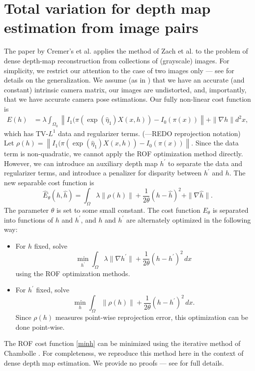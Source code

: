 \documentclass[conference]{IEEEtran}
\begin{document}
\section{Total variation for depth map estimation from image pairs}
The paper by Cremer's et al. \cite{dense_geometry} applies the method of Zach et al. \cite{tv_optical_flow} to
the problem of dense depth-map
reconstruction from collections of (grayscale) images. For simplicity, we restrict our attention to the case of two images only ---
see \cite{dense_geometry} for details on the generalization. We assume (as in \cite{dense_geometry}) that we have an accurate (and constant) intrinsic camera matrix,
our images are undistorted, and, importantly, that we have accurate camera pose estimations.
Our fully non-linear cost function is
\begin{equation}
\begin{split}
E(h) &= \lambda \int_{\Omega_0}\left\|I_1(\pi(\exp(\hat{\eta}_1)X(x,h)) - I_0(\pi(x))\right\|
     + \|\nabla h\| d^2 x,
\end{split}
\end{equation}
which has TV-$L^1$ \cite{tv_optical_flow} data and regularizer terms.
(---REDO reprojection notation)
Let $\rho(h) = \left\|I_1(\pi(\exp(\hat{\eta}_1)X(x,h)) - I_0(\pi(x))\right\|$. Since the data term is non-quadratic, we
cannot apply the ROF optimization method directly. However, we can introduce
an auxiliary depth map $h^\prime$ to separate the data and regularizer terms,
and introduce a penalizer for disparity between $h^\prime$ and $h$. The
new separable cost function is
\begin{equation}\label{separable_cost}
    \hat{E}_\theta(h, \hat{h}) = \int_\Omega \lambda \|\rho(h)\| + \frac{1}{2\theta}(h - \hat{h})^2 + \|\nabla \hat{h}\|.
\end{equation}
The parameter $\theta$ is set to some small constant.
The cost function $E_\theta$ is separated into functions of $h$ and $h^\prime$,
and $h$ and $h^\prime$ are alternately optimized in the following way:
\begin{itemize}
    \item For $h$ fixed, solve
        \begin{equation}\label{minh}
            \min_{h^\prime} \int_\Omega \lambda \|\nabla h^\prime\| + \frac{1}{2\theta}(h - h^\prime)^2\,dx
        \end{equation}
    using the ROF optimization methods.
    \item For $h^\prime$ fixed, solve
        \begin{equation}\label{minhhat}
            \min_h \int_\Omega \|\rho(h)\| + \frac{1}{2\theta}(h - h^\prime)^2\,dx.
        \end{equation}
        Since $\rho(h)$ measures point-wise reprojection error, this
        optimization can be done point-wise.
\end{itemize}
The ROF cost function \eqref{minh} can be minimized using the iterative method of Chambolle \cite{chambolle}. For completeness, we reproduce this
method here in the context of dense depth map estimation. We provide no proofs --- see \cite{chambolle} for full details.
\end{document}
